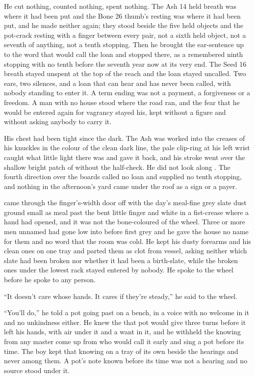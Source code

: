 He cut nothing, counted nothing, spent nothing. The Ash 14 held breath was where it had been put and the Bone 26 thumb's resting was where it had been put, and he made neither again; they stood beside the five held objects and the pot-crack resting with a finger between every pair, not a sixth held object, not a seventh of anything, not a tenth stopping. Then he brought the ear-sentence up to the word that would call the loan and stopped there, as a remembered ninth stopping with no tenth before the seventh year now at its very end. The Seed 16 breath stayed unspent at the top of the reach and the loan stayed uncalled. Two ears, two silences, and a loan that can hear and has never been called, with nobody standing to enter it. A term ending was not a payment, a forgiveness or a freedom. A man with no house stood where the road ran, and the fear that he would be entered again for vagrancy stayed his, kept without a figure and without asking anybody to carry it.

His chest had been tight since the dark. The Ash was worked into the creases of his knuckles in the colour of the clean dark line, the pale clip-ring at his left wrist caught what little light there was and gave it back, and his stroke went over the shallow bright patch of  without the half-check. He did not look along . The fourth direction over the boards called no loan and supplied no tenth stopping, and nothing in the afternoon's yard came under the roof as a sign or a payer.

 came through the finger's-width door off  with the day's meal-fine grey slate dust ground small as meal past the bent little finger and white in a fist-crease where a hand had opened, and it was not the bone-coloured  of the wheel. Three or more men unnamed had gone low into  before first grey and he gave the house no name for them and no word that the room was cold. He kept his dusty forearms and his clean ones on one tray and parted them as clot from vessel, asking neither which slate had been broken nor whether it had been a birth-slate, while the broken ones under the lowest rack stayed entered by nobody. He spoke to the wheel before he spoke to any person.

“It doesn't care whose hands. It cares if they're steady,” he said to the wheel.

“You'll do,” he told a pot going past on a bench, in a voice with no welcome in it and no unkindness either. He knew the  that pot would give three turns before it left his hands, with air under it and a want in it, and he withheld the knowing from any master come up from  who would call it early and sing a pot before its time. The boy kept that knowing on a tray of its own beside the hearings and never among them. A pot's note known before its time was not a hearing and no source stood under it.

